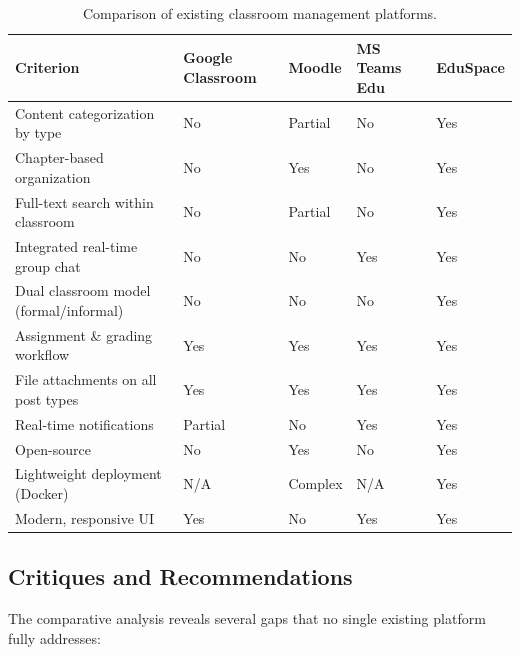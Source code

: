 \begin{table}[H]
  \centering
  \caption{Comparison of existing classroom management platforms.}
  \label{tab:comparison}
  \small
  \begin{tabularx}{\textwidth}{@{} l *{4}{>{\centering\arraybackslash}X} @{}}
    \toprule
    \textbf{Criterion} & \textbf{Google Classroom} & \textbf{Moodle} & \textbf{MS Teams Edu} & \textbf{EduSpace} \\
    \midrule
    Content categorization by type     & No  & Partial & No  & Yes \\
    Chapter-based organization         & No  & Yes     & No  & Yes \\
    Full-text search within classroom  & No  & Partial & No  & Yes \\
    Integrated real-time group chat    & No  & No      & Yes & Yes \\
    Dual classroom model (formal/informal) & No & No   & No  & Yes \\
    Assignment \& grading workflow     & Yes & Yes     & Yes & Yes \\
    File attachments on all post types & Yes & Yes     & Yes & Yes \\
    Real-time notifications            & Partial & No  & Yes & Yes \\
    Open-source                        & No  & Yes     & No  & Yes \\
    Lightweight deployment (Docker)    & N/A & Complex & N/A & Yes \\
    Modern, responsive UI              & Yes & No      & Yes & Yes \\
    \bottomrule
  \end{tabularx}
\end{table}

\subsection{Critiques and Recommendations}
\label{sec:critiques}

The comparative analysis reveals several gaps that no single existing platform fully addresses:

